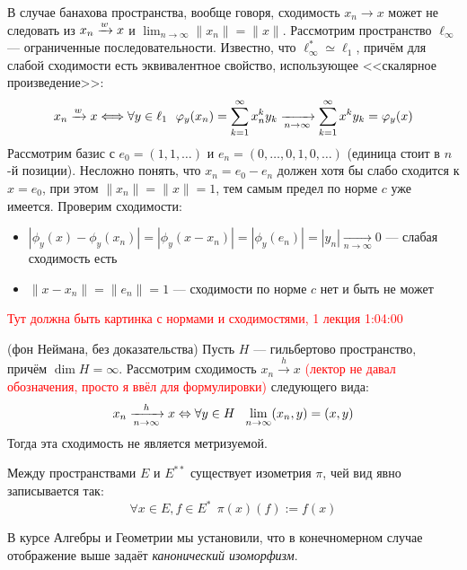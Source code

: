 \begin{anote}
	В случае банахова пространства, вообще говоря, сходимость $x_n \to x$ может не следовать из $x_n \xrightarrow{w} x$ и $\lim_{n \to \infty} \|x_n\| = \|x\|$. Рассмотрим пространство $\ell_\infty$ --- ограниченные последовательности. Известно, что $\ell_\infty^* \simeq \ell_1$, причём для слабой сходимости есть эквивалентное свойство, использующее <<скалярное произведение>>:
	\[
		x_n \xrightarrow{w} x \Longleftrightarrow \forall y \in \ell_1\ \ \varphi_y(x_n) = \sum_{k = 1}^\infty x_n^ky_k \xrightarrow[n \to \infty]{} \sum_{k = 1}^\infty x^ky_k = \varphi_y(x)
	\]
	Рассмотрим базис с $e_0 = (1, 1, \ldots)$ и $e_n = (0, \ldots, 0, 1, 0, \ldots)$ (единица стоит в $n$-й позиции). Несложно понять, что $x_n = e_0 - e_n$ должен хотя бы слабо сходится к $x = e_0$, при этом $\|x_n\| = \|x\| = 1$, тем самым предел по норме $c$ уже имеется. Проверим сходимости:
	\begin{itemize}
		\item $|\phi_y(x) - \phi_y(x_n)| = |\phi_y(x - x_n)| = |\phi_y(e_n)| = |y_n| \xrightarrow[n \to \infty]{} 0$ --- слабая сходимость есть
		
		\item $\|x - x_n\| = \|e_n\| = 1$ --- сходимости по норме $c$ нет и быть не может
	\end{itemize}
\end{anote}

\textcolor{red}{Тут должна быть картинка с нормами и сходимостями, 1 лекция 1:04:00}

\begin{theorem} (фон Неймана, без доказательства)
	Пусть $H$ --- гильбертово пространство, причём $\dim H = \infty$. Рассмотрим сходимость $x_n \xrightarrow{h} x$ \textcolor{red}{(лектор не давал обозначения, просто я ввёл для формулировки)} следующего вида:
	\[
		x_n \xrightarrow[n \to \infty]{h} x \Leftrightarrow \forall y \in H\ \ \lim_{n \to \infty} (x_n, y) = (x, y)
	\]
	Тогда эта сходимость не является метризуемой.
\end{theorem}

\begin{theorem}
	Между пространствами $E$ и $E^{**}$ существует изометрия $\pi$, чей вид явно записывается так:
	\[
		\forall x \in E, f \in E^*\ \ \pi(x)(f) := f(x)
	\]
\end{theorem}

\begin{anote}
	В курсе Алгебры и Геометрии мы установили, что в конечномерном случае отображение выше задаёт \textit{канонический изоморфизм}.
\end{anote}

